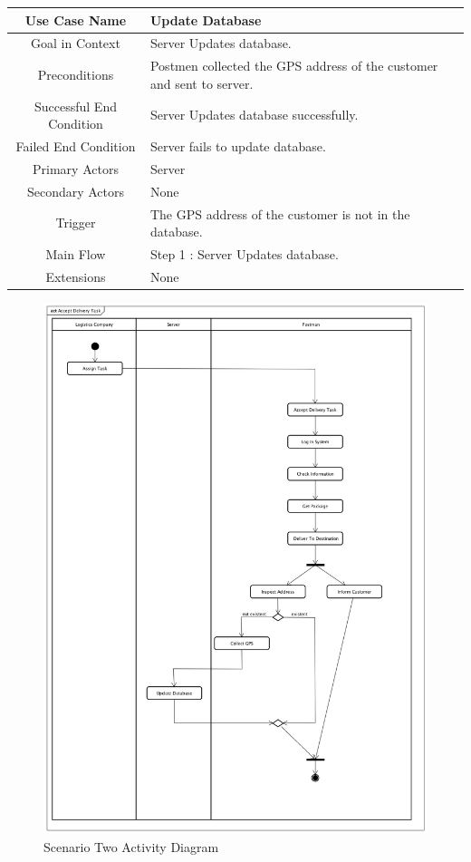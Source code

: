 \documentclass[12pt]{scrreprt}
\begin{document}
\begin{table}
  \centering
  \begin{tabular}{| c | p{11cm} |}
    \hline
    Use Case Name & Update Database\\
    \hline
    Goal in Context & Server Updates database.\\
    \hline
    Preconditions & Postmen collected the GPS address of the customer and
    sent to server.\\
    \hline
    Successful End Condition & Server Updates database successfully.\\
    \hline
    Failed End Condition & Server fails to update database.\\
    \hline
    Primary Actors & Server\\
    \hline
    Secondary Actors & None\\
    \hline
    Trigger & The GPS address of  the customer is not in the database.\\
    \hline
    Main Flow & Step 1 : Server Updates database.\\
    \hline
    Extensions & None\\
    \hline
  \end{tabular}
\end{table}

\begin{figure}[H]
  \centering\includegraphics[width=5in]{DocumentRes/2ActivityDiagram.png}
  \caption{Scenario Two Activity Diagram}
\end{figure}
\end{document}
